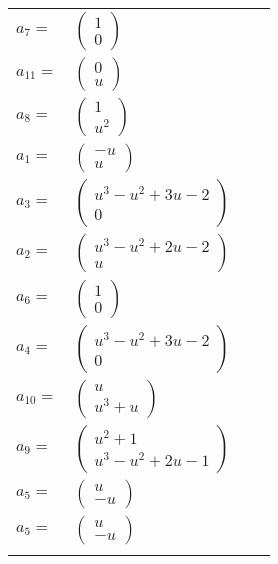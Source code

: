 \documentclass[1p]{elsarticle_modified}
\theoremstyle{definition}
\begin{document}
\begin{tabular}{m{7pt} m{180pt} m{7pt} m{180pt} }
\flushright $a_{7}=$&$\begin{pmatrix}1\\0\end{pmatrix}$ \\
\flushright $a_{11}=$&$\begin{pmatrix}0\\u\end{pmatrix}$ \\
\flushright $a_{8}=$&$\begin{pmatrix}1\\u^2\end{pmatrix}$ \\
\flushright $a_{1}=$&$\begin{pmatrix}- u\\u\end{pmatrix}$ \\
\flushright $a_{3}=$&$\begin{pmatrix}u^3- u^2+3 u-2\\0\end{pmatrix}$ \\
\flushright $a_{2}=$&$\begin{pmatrix}u^3- u^2+2 u-2\\u\end{pmatrix}$ \\
\flushright $a_{6}=$&$\begin{pmatrix}1\\0\end{pmatrix}$ \\
\flushright $a_{4}=$&$\begin{pmatrix}u^3- u^2+3 u-2\\0\end{pmatrix}$ \\
\flushright $a_{10}=$&$\begin{pmatrix}u\\u^3+u\end{pmatrix}$ \\
\flushright $a_{9}=$&$\begin{pmatrix}u^2+1\\u^3- u^2+2 u-1\end{pmatrix}$ \\
\flushright $a_{5}=$&$\begin{pmatrix}u\\- u\end{pmatrix}$\\ \flushright $a_{5}=$&$\begin{pmatrix}u\\- u\end{pmatrix}$\\&\end{tabular}
\end{document}
